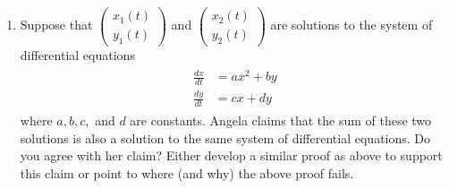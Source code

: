 \begin{enumerate}
\begin{enumerate}
\item	Suppose that \label{12HWprob7partb} $\displaystyle  \begin{pmatrix}
x_1(t)\\y_1(t)\end{pmatrix}$  and $\displaystyle  \begin{pmatrix}
x_2(t)\\y_2(t)\end{pmatrix}$  are solutions to the system of differential equations
\begin{align*}\begin{split}
\frac{dx}{dt}&=ax^2+by\\ \frac{dy}{dt}&= cx+dy
\end{split}\end{align*}
 where $a, b, c,$ and $d$ are constants. Angela claims that the sum of these two solutions is also a solution to the same system of differential equations. Do you agree with her claim? Either develop a similar proof as above to support this claim or point to where (and why) the above proof fails.

\end{enumerate}

\end{enumerate}
